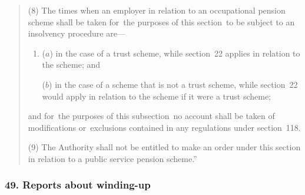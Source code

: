 \documentclass[12pt,a4paper]{article}
\begin{document}
\begin{quotation}
(8) The times when an employer in relation to an occupational pension scheme shall be taken for~the purposes of this section~to be subject to an insolvency procedure are—
\begin{enumerate}\item[]
($a$) in the case of a trust scheme, while section~22 applies in relation to the scheme; and

($b$) in the case of a scheme that is not a trust scheme, while section~22 would apply in relation to the scheme if it were a trust scheme;
\end{enumerate}
and for~the purposes of this subsection~no account shall be taken of modifications or~exclusions contained in any regulations under section~118. 

(9) The Authority shall not be entitled to make an order under this section in relation to a public service pension scheme.”
\end{quotation}

\subsubsection{49. Reports about winding-up}
\end{document}
